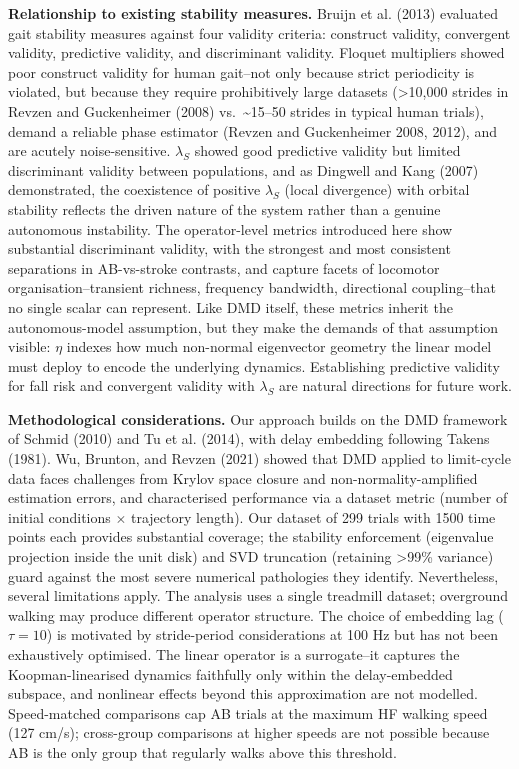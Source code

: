 \documentclass[
  letterpaper,
  DIV=11,
  numbers=noendperiod]{scrartcl}
\begin{document}
\textbf{Relationship to existing stability measures.} Bruijn et al.
(2013) evaluated gait stability measures against four validity criteria:
construct validity, convergent validity, predictive validity, and
discriminant validity. Floquet multipliers showed poor construct
validity for human gait--not only because strict periodicity is
violated, but because they require prohibitively large datasets
(\textgreater10,000 strides in Revzen and Guckenheimer (2008)
vs.~\textasciitilde15--50 strides in typical human trials), demand a
reliable phase estimator (Revzen and Guckenheimer 2008, 2012), and are
acutely noise-sensitive. \(\lambda_S\) showed good predictive validity
but limited discriminant validity between populations, and as Dingwell
and Kang (2007) demonstrated, the coexistence of positive \(\lambda_S\)
(local divergence) with orbital stability reflects the driven nature of
the system rather than a genuine autonomous instability. The
operator-level metrics introduced here show substantial discriminant
validity, with the strongest and most consistent separations in
AB-vs-stroke contrasts, and capture facets of locomotor
organisation--transient richness, frequency bandwidth, directional
coupling--that no single scalar can represent. Like DMD itself, these
metrics inherit the autonomous-model assumption, but they make the
demands of that assumption visible: \(\eta\) indexes how much non-normal
eigenvector geometry the linear model must deploy to encode the
underlying dynamics. Establishing predictive validity for fall risk and
convergent validity with \(\lambda_S\) are natural directions for future
work.

\textbf{Methodological considerations.} Our approach builds on the DMD
framework of Schmid (2010) and Tu et al. (2014), with delay embedding
following Takens (1981). Wu, Brunton, and Revzen (2021) showed that DMD
applied to limit-cycle data faces challenges from Krylov space closure
and non-normality-amplified estimation errors, and characterised
performance via a dataset metric (number of initial conditions
\(\times\) trajectory length). Our dataset of 299 trials with 1500 time
points each provides substantial coverage; the stability enforcement
(eigenvalue projection inside the unit disk) and SVD truncation
(retaining \textgreater99\% variance) guard against the most severe
numerical pathologies they identify. Nevertheless, several limitations
apply. The analysis uses a single treadmill dataset; overground walking
may produce different operator structure. The choice of embedding lag
(\(\tau = 10\)) is motivated by stride-period considerations at 100 Hz
but has not been exhaustively optimised. The linear operator is a
surrogate--it captures the Koopman-linearised dynamics faithfully only
within the delay-embedded subspace, and nonlinear effects beyond this
approximation are not modelled. Speed-matched comparisons cap AB trials
at the maximum HF walking speed (127 cm/s); cross-group comparisons at
higher speeds are not possible because AB is the only group that
regularly walks above this threshold.
\end{document}
